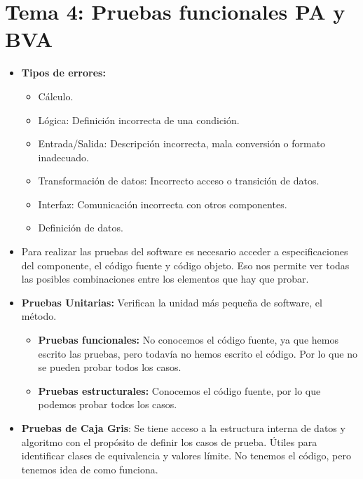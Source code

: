 \documentclass[12pt, twoside, openright]{report} %
\begin{document}
\chapter{Tema 4: Pruebas funcionales PA y BVA}

\begin{itemize}
\item \textbf{Tipos de errores:}
  

  \begin{itemize}
  \item Cálculo.
    
  \item Lógica: Definición incorrecta de una condición.
    
  \item Entrada/Salida: Descripción incorrecta, mala conversión o formato
    inadecuado.
    
  \item Transformación de datos: Incorrecto acceso o transición de datos.
    
  \item Interfaz: Comunicación incorrecta con otros componentes.
    
  \item Definición de datos.
    
  \end{itemize}
\item Para realizar las pruebas del software es necesario acceder a
  especificaciones del componente, el código fuente y código objeto. Eso
  nos permite ver todas las posibles combinaciones entre los elementos
  que hay que probar.
  
\item \textbf{Pruebas Unitarias:} Verifican la unidad más pequeña de
  software, el método.
  

  \begin{itemize}
  \item \textbf{Pruebas funcionales:} No conocemos el código fuente, ya que
    hemos escrito las pruebas, pero todavía no hemos escrito el código.
    Por lo que no se pueden probar todos los casos.
    
  \item \textbf{Pruebas estructurales:} Conocemos el código fuente, por lo
    que podemos probar todos los casos.
    
  \end{itemize}
\item \textbf{Pruebas de Caja Gris}: Se tiene acceso a la estructura interna
  de datos y algoritmo con el propósito de definir los casos de prueba.
  Útiles para identificar clases de equivalencia y valores límite. No
  tenemos el código, pero tenemos idea de como funciona.
  

\end{itemize}
\end{document}
